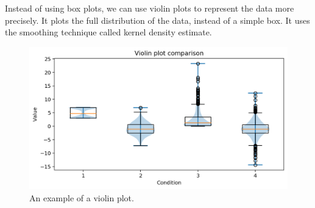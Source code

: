 \documentclass[a4paper, openany]{memoir}
\begin{document}
Instead of using box plots, we can use violin plots to represent the data more precisely. It plots the full distribution of the data, instead of a simple box. It uses the smoothing technique called kernel density estimate.
\begin{figure}[H]
    \centering
    \includegraphics[scale=0.5]{src/2.35 Gas Example Plot 19.png}
    \caption{An example of a violin plot.}
\end{figure}
\end{document}
